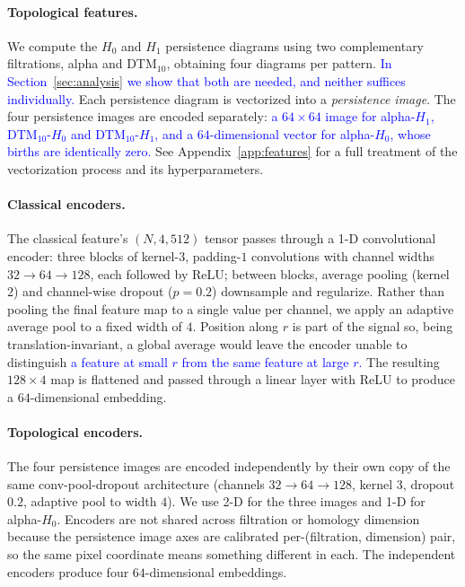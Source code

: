 \documentclass[twoside]{article}
\newcommand{\review}[1]{\textcolor{blue}{#1}}
\begin{document}
\paragraph{Topological features.}
We compute the $H_0$ and $H_1$ persistence diagrams using two complementary filtrations, alpha and DTM$_{10}$, obtaining four diagrams per pattern. \review{In Section~\ref{sec:analysis} we show that both are needed, and neither suffices individually.} Each persistence diagram is vectorized into a \emph{persistence image}. The four persistence images are encoded separately: \review{a $64\times64$ image for alpha-$H_1$, DTM$_{10}$-$H_0$ and DTM$_{10}$-$H_1$, and a $64$-dimensional vector for alpha-$H_0$, whose births are identically zero.} See Appendix~\ref{app:features} for a full treatment of the vectorization process and its hyperparameters.

\paragraph{Classical encoders.}
\label{sec:architecture}
The classical feature's $(N,4,512)$ tensor passes through a 1-D convolutional encoder: three blocks of kernel-$3$, padding-$1$ convolutions with channel widths $32\to64\to128$, each followed by ReLU; between blocks, average pooling (kernel $2$) and channel-wise dropout ($p=0.2$) downsample and regularize. Rather than pooling the final feature map to a single value per channel, we apply an adaptive average pool to a fixed width of $4$. Position along $r$ is part of the signal so, being translation-invariant, a global average would leave the encoder unable to distinguish \review{a feature at small $r$ from the same feature at large $r$.} The resulting $128\times4$ map is flattened and passed through a linear layer with ReLU to produce a $64$-dimensional embedding.

\paragraph{Topological encoders.}
The four persistence images are encoded independently by their own copy of the same conv-pool-dropout architecture (channels $32\to64\to128$, kernel $3$, dropout $0.2$, adaptive pool to width $4$). We use 2-D for the three images and 1-D for alpha-$H_0$. Encoders are not shared across filtration or homology dimension because the persistence image axes are calibrated per-(filtration, dimension) pair, so the same pixel coordinate means something different in each. The independent encoders produce four $64$-dimensional embeddings.
\end{document}
